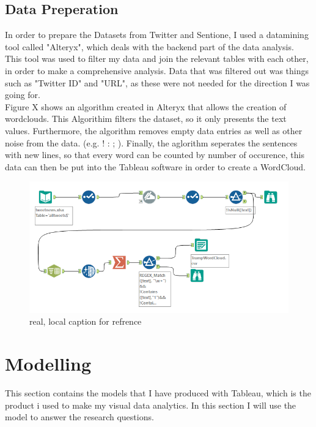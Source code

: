 \documentclass{article}
\begin{document}
\subsection{Data Preperation}
In order to prepare the Datasets from Twitter and Sentione, I used a datamining tool called "Alteryx", which deals with the backend part of the data analysis. This tool was used to filter my data and join the relevant tables with each other, in order to make a comprehensive analysis. Data that was filtered out was things such as "Twitter ID" and "URL", as these were not needed for the direction I was going for. \\


Figure X shows an algorithm created in Alteryx that allows the creation of wordclouds. This Algorithim filters the dataset, so it only presents the text values. Furthermore, the algorithm removes empty data entries as well as other noise from the data. (e.g. ! : ; ). Finally, the aglorithm seperates the sentences with new lines, so that every word can be counted by number of occurence, this data can then be put into the Tableau software in order to create a WordCloud.



\begin{figure}[H] %
	\centering %
\includegraphics [scale= .65]  {TrumpWordCloudAlteryxFinal.PNG}    %
	\caption[Optional caption] {real, local caption for refrence}
	\label{fig:wordcloudBliz}

\end{figure}

\section{Modelling}
This section contains the models that I have produced with Tableau, which is the product i used to make my visual data analytics. In this section I will use the model to answer the research questions. \\
\end{document}
